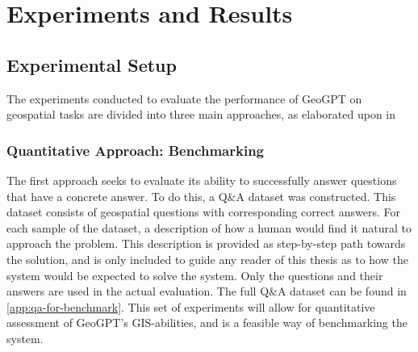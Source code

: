 \chapter{Experiments and Results}
\label{cha:experiments}

\section{Experimental Setup}
\label{sec:experimental-setup}

\begin{comment}
Trying and failing is a major part of research. However, to have a chance of success you need a plan driving the experimental research, just as you need a plan for your literature search. Further, plans are made to be revised and this revision ensures that any further decisions made are in line with the work already completed.

The plan should include what experiments or series of experiments are planned and what questions the individual or set of experiments aim to answer. Such questions should be connected to your research questions, so that in the evaluation of your results you can discuss the results wrt to the research questions.
\end{comment}

\begin{comment}
The experimental setup should include all data --- parameters, etc. --- that would allow a person to repeat your experiments.
This will thus be the actual instantiation for each experiment of the general architecture described in Chapter~\ref{cha:architecture}.
\end{comment}

The experiments conducted to evaluate the performance of GeoGPT on geospatial tasks are divided into three main approaches, as elaborated upon in

\subsection{Quantitative Approach: Benchmarking}

The first approach seeks to evaluate its ability to successfully answer questions that have a concrete answer. To do this, a Q\&A dataset was constructed. This dataset consists of geospatial questions with corresponding correct answers. For each sample of the dataset, a description of how a human would find it natural to approach the problem. This description is provided  as step-by-step path towards the solution, and is only included to guide any reader of this thesis as to how the system would be expected to solve the system. Only the questions and their answers are used in the actual evaluation. The full Q\&A dataset can be found in \autoref{app:qa-for-benchmark}. This set of experiments will allow for quantitative assessment of GeoGPT's GIS-abilities, and is a feasible way of benchmarking the system.

